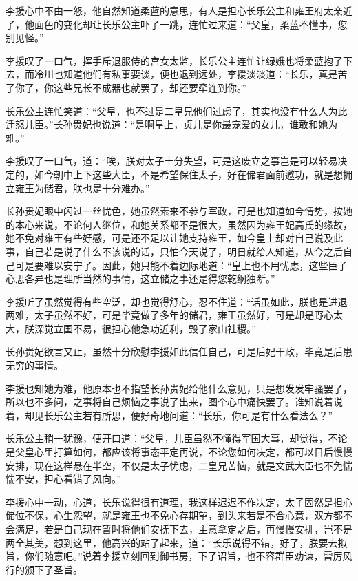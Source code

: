 李援心中不由一怒，他自然知道柔蓝的意思，有人是担心长乐公主和雍王府太亲近了，他面色的变化却让长乐公主吓了一跳，连忙过来道：“父皇，柔蓝不懂事，您别见怪。”

李援叹了一口气，挥手斥退服侍的宫女太监，长乐公主连忙让绿娥也将柔蓝抱了下去，而冷川也知道他们有私事要谈，便也退到远处，李援淡淡道：“长乐，真是苦了你了，你这些兄长不成器也就罢了，却还要牵连到你。”

长乐公主连忙笑道：“父皇，也不过是二皇兄他们过虑了，其实也没有什么人为此迁怒儿臣。”长孙贵妃也说道：“是啊皇上，贞儿是你最宠爱的女儿，谁敢和她为难。”

李援叹了一口气，道：“唉，朕对太子十分失望，可是这废立之事岂是可以轻易决定的，如今朝中上下这些大臣，不是希望保住太子，好在储君面前邀功，就是想拥立雍王为储君，朕也是十分难办。”

长孙贵妃眼中闪过一丝忧色，她虽然素来不参与军政，可是也知道如今情势，按她的本心来说，不论何人继位，和她关系都不是很大，虽然因为雍王妃高氏的缘故，她不免对雍王有些好感，可是还不足以让她支持雍王，如今皇上却对自己说及此事，自己若是说了什么不该说的话，只怕今天说了，明日就给人知道，从今之后自己可是要难以安宁了。因此，她只能不着边际地道：“皇上也不用忧虑，这些臣子心思各异也是理所当然的事情，这立储之事还是得您乾纲独断。”

李援听了虽然觉得有些空泛，却也觉得舒心，忍不住道：“话虽如此，朕也是进退两难，太子虽然不好，可是毕竟做了多年的储君，雍王虽然好，可是却是野心太大，朕深觉立国不易，很担心他急功近利，毁了家山社稷。”

长孙贵妃欲言又止，虽然十分欣慰李援如此信任自己，可是后妃干政，毕竟是后患无穷的事情。

李援也知她为难，他原本也不指望长孙贵妃给他什么意见，只是想发发牢骚罢了，所以也不多问，之事将自己烦恼之事说了出来，图个心中痛快罢了。谁知说着说着，却见长乐公主若有所思，便好奇地问道：“长乐，你可是有什么看法么？”

长乐公主稍一犹豫，便开口道：“父皇，儿臣虽然不懂得军国大事，却觉得，不论是父皇心里打算如何，都应该将事态平定再说，不论您如何决定，都可以日后慢慢安排，现在这样悬在半空，不仅是太子忧虑，二皇兄苦恼，就是文武大臣也不免惴惴不安，担心看错了风向。”

李援心中一动，心道，长乐说得很有道理，我这样迟迟不作决定，太子固然是担心储位不保，心生怨望，就是雍王也不免心存期望，到头来若是不合心意，双方都不会满足，若是自己现在暂时将他们安抚下去，主意拿定之后，再慢慢安排，岂不是两全其美，想到这里，他高兴的站了起来，道：“长乐说得不错，好了，朕要去拟旨，你们随意吧。”说着李援立刻回到御书房，下了诏旨，也不容群臣劝谏，雷厉风行的颁下了圣旨。

